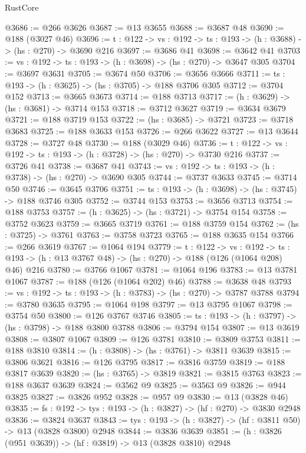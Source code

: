 \begin{lexlean}{RustCore}
\begin{coremodule}
@3686 := @266 @3626
@3687 := @13 @3655
@3688 := @3687 @48
@3690 := @188 (@3027 @46)
@3696 := {t : @122} -> {vs : @192} -> {ts : @193} -> (h : @3688) -> (hs : @270) -> @3690 @216
@3697 := @3686 @41
@3698 := @3642 @41
@3703 := {vs : @192} -> {ts : @193} -> (h : @3698) -> (hs : @270) -> @3647 @305
@3704 := @3697 @3631
@3705 := @3674 @50
@3706 := @3656 @3666
@3711 := {ts : @193} -> (h : @3625) -> (hs : @3705) -> @188 @3706 @305
@3712 := @3704 @152
@3713 := @3665 @3673
@3714 := @188 @3713
@3717 := (h : @3629) -> (hs : @3681) -> @3714 @153
@3718 := @3712 @3627
@3719 := @3634 @3679
@3721 := @188 @3719 @153
@3722 := (hs : @3685) -> @3721
@3723 := @3718 @3683
@3725 := @188 @3633 @153
@3726 := @266 @3622
@3727 := @13 @3644
@3728 := @3727 @48
@3730 := @188 (@3029 @46)
@3736 := {t : @122} -> {vs : @192} -> {ts : @193} -> (h : @3728) -> (hs : @270) -> @3730 @216
@3737 := @3726 @41
@3738 := @3687 @41
@3743 := {vs : @192} -> {ts : @193} -> (h : @3738) -> (hs : @270) -> @3690 @305
@3744 := @3737 @3633
@3745 := @3714 @50
@3746 := @3645 @3706
@3751 := {ts : @193} -> (h : @3698) -> (hs : @3745) -> @188 @3746 @305
@3752 := @3744 @153
@3753 := @3656 @3713
@3754 := @188 @3753
@3757 := (h : @3625) -> (hs : @3721) -> @3754 @154
@3758 := @3752 @3623
@3759 := @3665 @3719
@3761 := @188 @3759 @154
@3762 := (hs : @3725) -> @3761
@3763 := @3758 @3723
@3765 := @188 @3635 @154
@3766 := @266 @3619
@3767 := @1064 @194
@3779 := {t : @122} ->
  {vs : @192} ->
  {ts : @193} -> (h : @13 @3767 @48) -> (hs : @270) -> @188 (@126 (@1064 @208) @46) @216
@3780 := @3766 @1067
@3781 := @1064 @196
@3783 := @13 @3781 @1067
@3787 := @188 (@126 (@1064 @202) @46)
@3788 := @3638 @48
@3793 := {vs : @192} -> {ts : @193} -> (h : @3783) -> (hs : @270) -> @3787 @3788
@3794 := @3780 @3635
@3795 := @1064 @198
@3797 := @13 @3795 @1067
@3798 := @3754 @50
@3800 := @126 @3767 @3746
@3805 := {ts : @193} -> (h : @3797) -> (hs : @3798) -> @188 @3800 @3788
@3806 := @3794 @154
@3807 := @13 @3619
@3808 := @3807 @1067
@3809 := @126 @3781
@3810 := @3809 @3753
@3811 := @188 @3810
@3814 := (h : @3808) -> (hs : @3761) -> @3811 @3639
@3815 := @3806 @3621
@3816 := @126 @3795
@3817 := @3816 @3759
@3819 := @188 @3817 @3639
@3820 := (hs : @3765) -> @3819
@3821 := @3815 @3763
@3823 := @188 @3637 @3639
@3824 := @3562 @9
@3825 := @3563 @9
@3826 := @944 @3825
@3827 := @3826 @952
@3828 := @957 @9
@3830 := @13 (@3828 @46)
@3835 := {fs : @192} -> {tys : @193} -> (h : @3827) -> (hf : @270) -> @3830 @2948
@3836 := @3824 @3637
@3843 := {tys : @193} -> (h : @3827) -> (hf : @3811 @50) -> @13 (@3828 @3800) @2948
@3844 := @3836 @3639
@3851 := (h : @3826 (@951 @3639)) -> (hf : @3819) -> @13 (@3828 @3810) @2948

\end{coremodule}
\end{lexlean}
